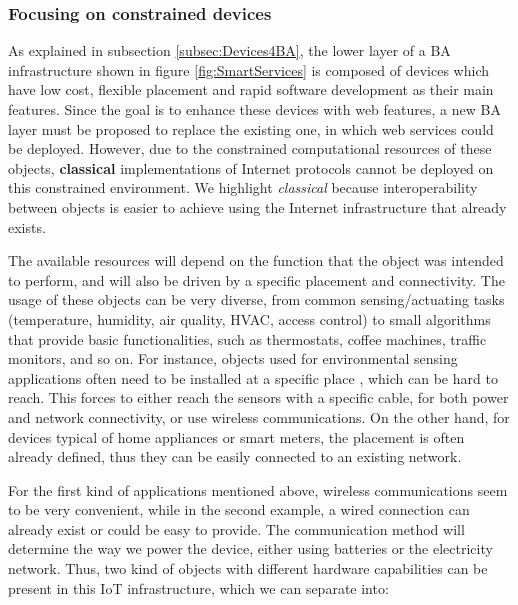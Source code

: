 \subsubsection{Focusing on constrained devices}
\label{subsec:constrainedObj}
As explained in subsection \ref{subsec:Devices4BA}, the lower layer of a BA infrastructure shown in figure \ref{fig:SmartServices} is composed of devices which have low cost, flexible placement and rapid software development as their main features.
Since the goal is to enhance these devices with web features, a new BA layer must be proposed to replace the existing one, in which web services could be deployed.
However, due to the constrained computational resources of these objects, \textbf{classical} implementations of Internet protocols cannot be deployed on this constrained environment.
We highlight \textit{classical} because interoperability between objects is easier to achieve using the Internet infrastructure that already exists.

The available resources will depend on the function that the object was intended to perform, and will also be driven by a specific placement and connectivity.
The usage of these objects can be very diverse, from common sensing/actuating tasks (temperature, humidity, air quality, HVAC, access control) to small algorithms that provide basic functionalities, such as thermostats, coffee machines, traffic monitors, and so on.
For instance, objects used for environmental sensing applications often need to be installed at a specific place \cite{younis2008placement}, which can be hard to reach. 
This forces to either reach the sensors with a specific cable, for both power and network connectivity, or use wireless communications.
On the other hand, for devices typical of home appliances or smart meters, the placement is often already defined, thus they can be easily connected to an existing network.

For the first kind of applications mentioned above, wireless communications seem to be very convenient, while in the second example, a wired connection can already exist or could be easy to provide.
The communication method will determine the way we power the device, either using batteries or the electricity network.
Thus, two kind of objects with different hardware capabilities can be present in this IoT infrastructure, which we can separate into:

